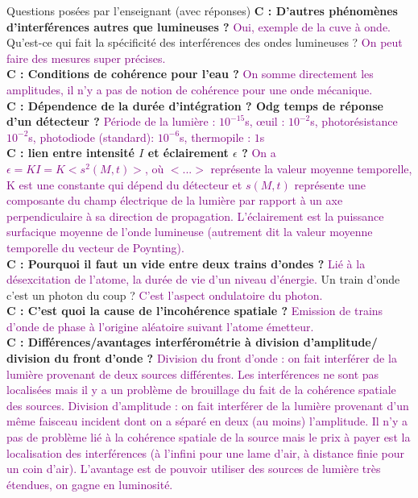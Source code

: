 \begin{reportBlock}{Questions posées par l’enseignant (avec réponses)}
   \textbf{C : D'autres phénomènes d'interférences autres que lumineuses ?}  \textcolor{purple}{Oui, exemple de la cuve à onde.} Qu'est-ce qui fait la spécificité des interférences des ondes lumineuses ? \textcolor{purple}{On peut faire des mesures super précises.}\\
   \textbf{C : Conditions de cohérence pour l'eau ?}  \textcolor{purple}{On somme directement les amplitudes, il n'y a pas de notion de cohérence pour une onde mécanique.}\\
   \textbf{C : Dépendence de la durée d'intégration ? Odg temps de réponse d'un détecteur ?}  \textcolor{purple}{Période de la lumière  : $10^{-15}$s, \oe uil : $10^{-2}$s,  photorésistance $10^{-2}$s, photodiode (standard): $10^{-6}$s, thermopile : $1$s}\\
   \textbf{C : lien entre intensité $I$ et éclairement $\epsilon$ ?}  \textcolor{purple}{On a $\epsilon = KI = K<s^2(M,t)>$, où $<...>$ représente la valeur moyenne temporelle, K est une constante qui dépend du détecteur et $s(M,t)$ représente une composante du champ électrique de la lumière par rapport à un axe perpendiculaire à sa direction de propagation. L'éclairement est la puissance surfacique moyenne de l'onde lumineuse (autrement dit la valeur moyenne temporelle du vecteur de Poynting).}\\
   \textbf{C : Pourquoi il faut un vide entre deux trains d'ondes ?}  \textcolor{purple}{Lié à la désexcitation de l'atome, la durée de vie d'un niveau d'énergie.} Un train d'onde c'est un photon du coup ? \textcolor{purple}{C'est l'aspect ondulatoire du photon.}\\
   \textbf{C : C'est quoi la cause de l'incohérence spatiale ?} \textcolor{purple}{Emission de trains d'onde de phase à l'origine aléatoire suivant l'atome émetteur.}\\

   \textbf{C : Différences/avantages interférométrie à division d'amplitude/ division du front d'onde ?} \textcolor{purple}{Division du front d'onde : on fait interférer de la lumière provenant de deux sources différentes. Les interférences ne sont pas localisées mais il y a un problème de brouillage du fait de la cohérence spatiale des sources. Division d'amplitude : on fait interférer de la lumière provenant d'un même faisceau incident dont on a séparé en deux (au moins) l'amplitude. Il n'y a pas de problème lié à la cohérence spatiale de la source mais le prix à payer est la localisation des interférences (à l'infini pour une lame d'air, à distance finie pour un coin d'air). L'avantage est de pouvoir utiliser des sources de lumière très étendues, on gagne en luminosité.}\\


\end{reportBlock}
